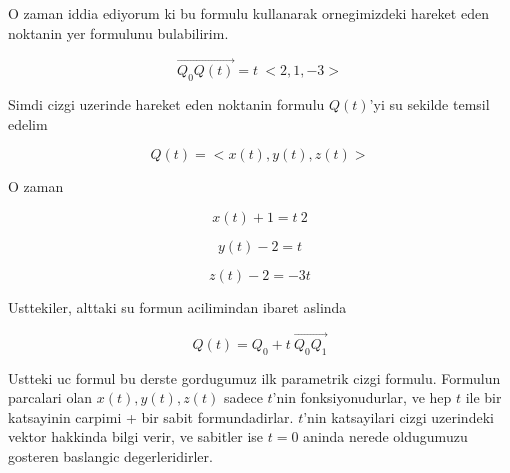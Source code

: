 \documentclass[12pt,fleqn]{article}
\begin{document}
O zaman iddia ediyorum ki bu formulu kullanarak ornegimizdeki hareket eden
noktanin yer formulunu bulabilirim.

\[ \vec{Q_0Q(t)} = t \ <2,1,-3>  \]

Simdi cizgi uzerinde hareket eden noktanin formulu $Q(t)$'yi su sekilde
temsil edelim

\[ Q(t) = <x(t),y(t),z(t)> \]

O zaman

\[ x(t) + 1 = t \ 2 \]

\[ y(t) - 2 = t \]

\[ z(t) - 2 = -3t \]

Usttekiler, alttaki su formun acilimindan ibaret aslinda

\[ Q(t) = Q_0 + t \ \vec{Q_0Q_1}  \]

Ustteki uc formul bu derste gordugumuz ilk parametrik cizgi
formulu. Formulun parcalari olan $x(t),y(t),z(t)$ sadece $t$'nin
fonksiyonudurlar, ve hep $t$ ile bir katsayinin carpimi + bir sabit
formundadirlar. $t$'nin katsayilari cizgi uzerindeki vektor hakkinda bilgi
verir, ve sabitler ise $t=0$ aninda nerede oldugumuzu gosteren baslangic
degerleridirler. 
\end{document}
